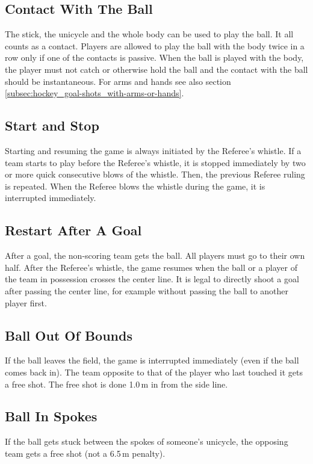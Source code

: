 \subsection{Contact With The Ball}
The stick, the unicycle and the whole body can be used to play the ball.
It all counts as a contact.
Players are allowed to play the ball with the body twice in a row only if one of the contacts is passive.
When the ball is played with the body, the player must not catch or otherwise hold the ball and the contact with the ball should be instantaneous.
For arms and hands see also section \ref{subsec:hockey_goal-shots_with-arms-or-hands}.

\subsection{Start and Stop}
Starting and resuming the game is always initiated by the Referee's whistle.
If a team starts to play before the Referee's whistle, it is stopped immediately by two or more quick consecutive blows of the whistle.
Then, the previous Referee ruling is repeated.
When the Referee blows the whistle during the game, it is interrupted immediately.

\subsection{Restart After A Goal}
After a goal, the non-scoring team gets the ball.
All players must go to their own half.
After the Referee's whistle, the game resumes when the ball or a player of the team in possession crosses the center line.
It is legal to directly shoot a goal after passing the center line, for example without passing the ball to another player first.

\subsection{Ball Out Of Bounds}
If the ball leaves the field, the game is interrupted immediately (even if the ball comes back in).
The team opposite to that of the player who last touched it gets a free shot.
The free shot is done 1.0\,m in from the side line.

\subsection{Ball In Spokes}
If the ball gets stuck between the spokes of someone's unicycle, the opposing team gets a free shot (not a 6.5\,m penalty).

